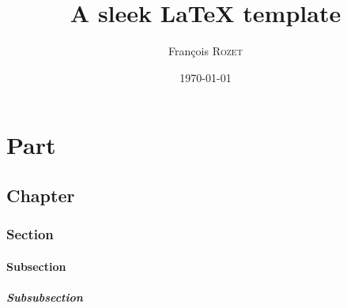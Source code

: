 \documentclass[a4paper, 12pt]{report}
\title{A sleek \LaTeX{} template}
\author{François \textsc{Rozet}\\}
\date{\today}
\begin{document}
	
	\romantableofcontents
	\part{Part}
	\chapter{Chapter}
	\section{Section}
	\subsection{Subsection}
	\subsubsection{Subsubsection}
\end{document}
